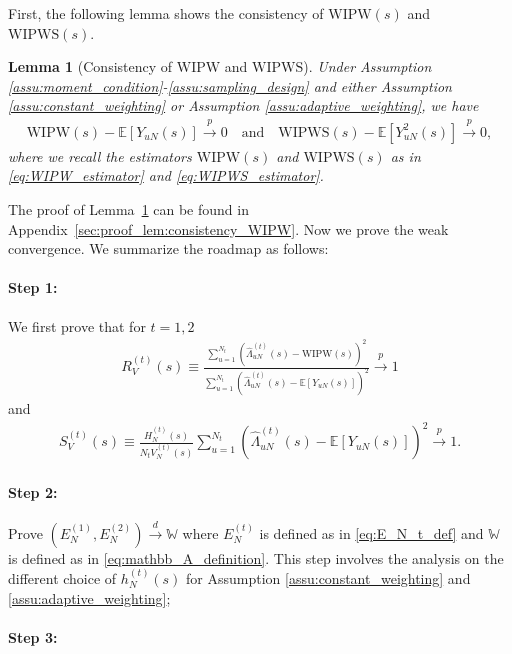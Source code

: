 \documentclass[12pt]{article}
\newtheorem{lemma}{Lemma}
\newcommand{\E}{\mathbb E}								%
\newcommand{\convp}{\overset p \rightarrow}             %
\newcommand{\convd}{\overset d \rightarrow}             %
\newcommand{\WIPW}{\mathrm{WIPW}}
\newcommand{\WIPWS}{\mathrm{WIPWS}}
\begin{document}
First, the following lemma shows the consistency of $\WIPW(s)$ and $\WIPWS(s)$. 

\begin{lemma}[Consistency of $\WIPW$ and $\WIPWS$]\label{lem:consistency_WIPW}
	Under Assumption \ref{assu:moment_condition}-\ref{assu:sampling_design} and either Assumption \ref{assu:constant_weighting} or Assumption \ref{assu:adaptive_weighting}, we have
	\begin{align*}
		\WIPW(s)-\E[Y_{uN}(s)]\convp 0\quad\text{and}\quad\WIPWS(s)-\E[Y_{uN}^2(s)]\convp 0,
	\end{align*}
	where we recall the estimators $\WIPW(s)$ and $\WIPWS(s)$ as in \eqref{eq:WIPW_estimator} and \eqref{eq:WIPWS_estimator}.
\end{lemma}
\noindent The proof of Lemma~\ref{lem:consistency_WIPW} can be found in Appendix~\ref{sec:proof_lem:consistency_WIPW}. Now we prove the weak convergence. We summarize the roadmap as follows:

\paragraph{Step 1:}

We first prove that for $t=1,2$
	\begin{align*}
		R_{V}^{(t)}(s)\equiv \frac{\sum_{u=1}^{N_t}(\hat{\Lambda}_{uN}^{(t)}(s)-\WIPW(s))^2}{\sum_{u=1}^{N_t}(\hat{\Lambda}_{uN}^{(t)}(s)-\E[Y_{uN}(s)])^2}\convp 1
	\end{align*}
	and 
	\begin{align*}
		S_{V}^{(t)}(s)\equiv \frac{H_N^{(t)}(s)}{N_tV^{(t)}_{N}(s)}\sum_{u=1}^{N_t}(\hat{\Lambda}_{uN}^{(t)}(s)-\E[Y_{uN}(s)])^2\convp 1.
	\end{align*}

\paragraph{Step 2:}

Prove $(E_{N}^{(1)},E_{N}^{(2)})\convd \mathbb W$ where $E_N^{(t)}$ is defined as in \eqref{eq:E_N_t_def} and $\mathbb W$ is defined as in \eqref{eq:mathbb_A_definition}. This step involves the analysis on the different choice of $h_{N}^{(t)}(s)$ for Assumption \ref{assu:constant_weighting} and \ref{assu:adaptive_weighting};

\paragraph{Step 3:}
\end{document}
